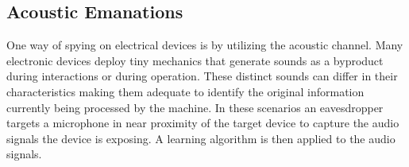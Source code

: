 




\subsection{Acoustic Emanations}
One way of spying on electrical devices is by utilizing the acoustic channel. Many electronic devices deploy tiny mechanics that generate sounds as a byproduct during interactions or during operation. These distinct sounds can differ in their characteristics making them adequate to identify the original information currently being processed by the machine. In these scenarios an eavesdropper targets a microphone in near proximity of the target device to capture the audio signals the device is exposing. A learning algorithm is then applied to the audio signals. \\

